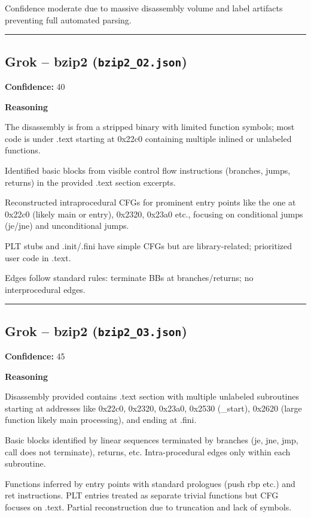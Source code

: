 Confidence moderate due to massive disassembly volume and label artifacts preventing full automated parsing.

\bigskip
\hrule
\bigskip

\subsection{Grok -- bzip2 (\texttt{bzip2\_O2.json})}

\textbf{Confidence:} 40

\textbf{Reasoning}

The disassembly is from a stripped binary with limited function symbols; most code is under .text starting at 0x22c0 containing multiple inlined or unlabeled functions.

Identified basic blocks from visible control flow instructions (branches, jumps, returns) in the provided .text section excerpts.

Reconstructed intraprocedural CFGs for prominent entry points like the one at 0x22c0 (likely main or entry), 0x2320, 0x23a0 etc., focusing on conditional jumps (je/jne) and unconditional jumps.

PLT stubs and .init/.fini have simple CFGs but are library-related; prioritized user code in .text.

Edges follow standard rules: terminate BBs at branches/returns; no interprocedural edges.

\bigskip
\hrule
\bigskip

\subsection{Grok -- bzip2 (\texttt{bzip2\_O3.json})}

\textbf{Confidence:} 45

\textbf{Reasoning}

Disassembly provided contains .text section with multiple unlabeled subroutines starting at addresses like 0x22c0, 0x2320, 0x23a0, 0x2530 (\_start), 0x2620 (large function likely main processing), and ending at .fini.

Basic blocks identified by linear sequences terminated by branches (je, jne, jmp, call does not terminate), returns, etc. Intra-procedural edges only within each subroutine.

Functions inferred by entry points with standard prologues (push rbp etc.) and ret instructions. PLT entries treated as separate trivial functions but CFG focuses on .text. Partial reconstruction due to truncation and lack of symbols.

